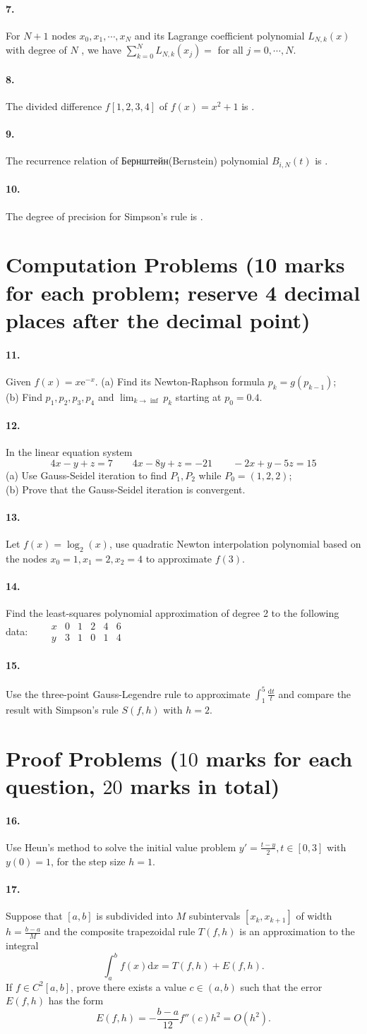 \documentclass{article}
\newcommand\ptsMulti[3]{ \textnormal{\small{($#2$ marks for each question, $#3$ marks in total)}}}
\newcommand{\shortline}{\underline{\hspace{1cm}}}
\newcommand{\longline}{\underline{\hspace{2cm}}}
\renewcommand{\d}{\mathrm{d}}
\newcommand{\ds}{\displaystyle}
\newcommand{\para}[1]{\paragraph{#1.}\hspace{-10pt}}
\begin{document}
    \para{7}For $N+1$ nodes $x_0,x_1,\cdots,x_N$ and its Lagrange coefficient polynomial $L_{N,k}(x)$ with degree of $N$ , we have $\ds \sum_{k=0}^N L_{N,k}(x_j)=$ \shortline for all $j=0,\cdots,N$.

    \para{8}The divided difference $f[1,2,3,4]$ of $f(x) = x^2+1$ is \longline.
    \para{9}The recurrence relation of Бернштейн(Bernstein) polynomial $B_{i,N}(t)$ is \longline.
    \para{10}The degree of precision for Simpson's rule is \longline.

    \section{Computation Problems \textnormal{\small{(10 marks for each problem; reserve 4 decimal places after the decimal point)}}}
    \para{11}Given $f(x)=x\mathrm{e}^{-x}$. (a) Find its Newton-Raphson formula $p_k=g(p_{k-1})$;\\ (b) Find $p_1,p_2,p_3,p_4$ and $\ds \lim_{k\to \inf}p_k$ starting at $p_0=0.4$.

    \para{12}In the linear equation system $$4x-y+z=7\qquad 4x-8y+z=-21\qquad -2x+y-5z=15$$
    (a) Use Gauss-Seidel iteration to find $P_1,P_2$ while $P_0=(1,2,2)$;\\ (b) Prove that the Gauss-Seidel iteration is convergent.

    \para{13}Let $f(x)=\log_2(x)$, use quadratic Newton interpolation polynomial based on the nodes $x_0=1,x_1=2,x_2=4$ to approximate $f(3)$.

    \para{14}Find the least-squares polynomial approximation of degree 2 to the following data:$\qquad \begin{array}{c|ccccc}
        x&0&1&2&4&6\\\hline y&3&1&0&1&4
    \end{array}$
    \para{15}Use the three-point \!Gauss-Legendre rule to approximate $\ds \!\!\int_1^5 \!\frac{\d t}{t}\!\!$ and compare the result with Simpson's rule $\!S(\!f,\!h)\!$ with $h\!\!=\!\!2$.

    \section{Proof Problems\ptsMulti{2}{10}{20}}
    \para{16}Use Heun's method to solve the initial value problem $\ds y'=\frac{t-y}{2}, t\in [0,3]$ with $y(0)=1$, for the step size $h=1$.
    \para{17}Suppose that $[a,b]$ is subdivided into $M$ subintervals $[x_k,x_{k+1}]$ of width $\ds h=\frac{b-a}{M}$ and the composite trapezoidal rule $T(f,h)$ is an approximation to the integral $$\int_a^b f(x)\d x=T(f,h)+E(f,h).$$ If $f\in C^2[a,b]$, prove there exists a value $c\in (a,b)$ such that the error $E(f,h)$ has the form $$E(f,h)=-\frac{b-a}{12}f''(c)h^2=O(h^2).$$
\end{document}

